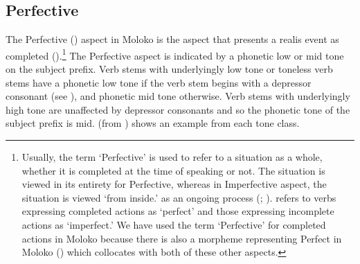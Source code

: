 \subsection{Perfective}\label{sec:7.4.1}
\hypertarget{RefHeading1212221525720847}{}
The Perfective (\textsc{{\PFV}}) aspect in Moloko is the aspect that presents a realis event as completed (\citealt{FriesenMamalis2008}).\footnote{Usually, the term ‘Perfective’ is used to refer to a situation as a whole, whether it is completed at the time of speaking or not.  The situation is viewed in its entirety for Perfective, whereas in Imperfective aspect, the situation is viewed ‘from inside.’ as an ongoing process (\citealt[3--4]{Comrie1976}; \citealt[239]{Payne1997}). \citet{Dixon2012} refers to verbs expressing completed actions as ‘perfect’ and those expressing incomplete actions as ‘imperfect.’ We have used the term ‘Perfective’ for completed actions in Moloko because there is also a morpheme representing Perfect in Moloko () which collocates with both of these other aspects.} The Perfective aspect is indicated by a phonetic low or mid tone on the subject prefix. Verb stems with underlyingly low tone or toneless verb stems have a phonetic low tone if the verb stem begins with a depressor consonant  (see ), and phonetic mid tone otherwise. Verb stems with underlyingly high tone are unaffected by depressor consonants and so the phonetic tone of the subject prefix is mid.  (from \citealt{FriesenMamalis2008}) shows an example from each tone class. 

\begin{table}
\caption{\label{tab:59}Perfective tone}
\end{table}

